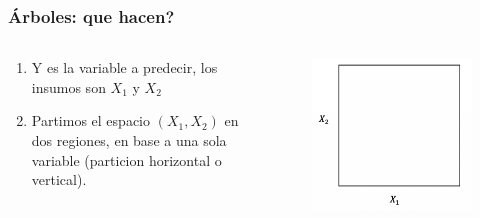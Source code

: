 \documentclass[
  shownotes,
  xcolor={svgnames},
  hyperref={colorlinks,citecolor=DarkBlue,linkcolor=DarkRed,urlcolor=DarkBlue}
  , aspectratio=169]{beamer}
\begin{document}
\begin{frame}[fragile]
\frametitle{Árboles: que hacen?}


\begin{columns}[T] %
\begin{column}{.42\textwidth}
  
\begin{enumerate}
    \footnotesize
\item Y es la variable a predecir, los insumos son $X_1$ y $X_2$
\item  Partimos el espacio $(X_1,X_2)$ en dos regiones, en base a una sola variable (particion horizontal o vertical).
\end{enumerate}


\end{column}  
\hfill
\begin{column}{.48\textwidth}

 \begin{figure}[H] \centering
            \captionsetup{justification=centering}
              \includegraphics[scale=0.4]{figures/cart_1}                           
 \end{figure}

\end{column}
\end{columns}

\end{frame}
\end{document}
